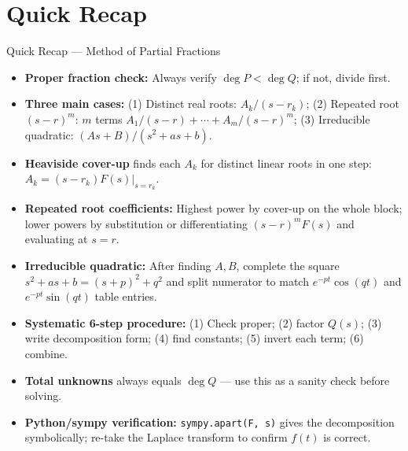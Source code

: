 \documentclass[12pt,a4paper]{article}
\begin{document}
\section{Quick Recap}
\begin{learnbox}{Quick Recap --- Method of Partial Fractions}
\begin{itemize}[noitemsep]
  \item \textbf{Proper fraction check:} Always verify $\deg P < \deg Q$;
    if not, divide first.
  \item \textbf{Three main cases:} (1) Distinct real roots: $A_k/(s-r_k)$;
    (2) Repeated root $(s-r)^m$: $m$ terms $A_1/(s-r)+\cdots+A_m/(s-r)^m$;
    (3) Irreducible quadratic: $(As+B)/(s^2+as+b)$.
  \item \textbf{Heaviside cover-up} finds each $A_k$ for distinct linear
    roots in one step: $A_k=(s-r_k)F(s)\big|_{s=r_k}$.
  \item \textbf{Repeated root coefficients:} Highest power by cover-up on
    the whole block; lower powers by substitution or differentiating
    $(s-r)^m F(s)$ and evaluating at $s=r$.
  \item \textbf{Irreducible quadratic:} After finding $A,B$, complete the
    square $s^2+as+b=(s+p)^2+q^2$ and split numerator to match
    $e^{-pt}\cos(qt)$ and $e^{-pt}\sin(qt)$ table entries.
  \item \textbf{Systematic 6-step procedure:} (1) Check proper;
    (2) factor $Q(s)$; (3) write decomposition form; (4) find constants;
    (5) invert each term; (6) combine.
  \item \textbf{Total unknowns} always equals $\deg Q$ --- use this as a
    sanity check before solving.
  \item \textbf{Python/sympy verification:} \texttt{sympy.apart(F, s)} gives
    the decomposition symbolically; re-take the Laplace transform to confirm
    $f(t)$ is correct.
\end{itemize}
\end{learnbox}
\end{document}

